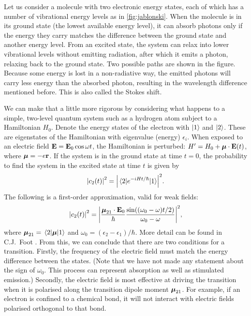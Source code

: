 Let us consider a molecule with two electronic energy states, each of which has a number of vibrational energy levels as in \autoref{fig:jablonski}. When the molecule is in its ground state (the lowest available energy level), it can absorb photons only if the energy they carry matches the difference between the ground state and another energy level. From an excited state, the system can relax into lower vibrational levels without emitting radiation, after which it emits a photon, relaxing back to the ground state. Two possible paths are shown in the figure. Because some energy is lost in a non-radiative way, the emitted photons will carry less energy than the absorbed photon, resulting in the wavelength difference mentioned before. This is also called the Stokes shift. 

We can make that a little more rigorous by considering what happens to a simple, two-level quantum system such as a hydrogen atom subject to a Hamiltonian $ H_0 $. Denote the energy states of the electron with $ \ket{1} $ and $ \ket{2} $. These are eigenstates of the Hamiltonian with eigenvalue (energy) $ \epsilon_i $. When exposed to an electric field $ \vb{E} = \vb{E}_0 \cos\omega t$, the Hamiltonian is perturbed: $ H' = H_0 + \vb*{\mu} \cdot \vb{E}(t) $, where $ \vb*{\mu} = -e\vb{r}$. If the system is in the ground state at time $ t=0 $, the probability to find the system in the excited state at time $ t $ is given by
\begin{equation}
	\abs{c_2(t)}^2 = \abs{\mel{2}{e^{-iHt/\hbar}}{1}}^2.
\end{equation}
The following is a first-order approximation, valid for weak fields:
\begin{equation}
	\abs{c_2(t)}^2 = \abs{ \frac{\vb*{\mu}_{21}\cdot\vb{E}_0}{\hbar}  \frac{\sin((\omega_0-\omega)t/2)}{\omega_0-\omega}}^2,
	\label{eq:transition moment}
\end{equation}
where $ \vb*{\mu}_{21} = \mel{2}{\vb*{\mu}}{1} $ and $ \omega_0 = (\epsilon_2-\epsilon_1)/\hbar $. More detail can be found in C.J.~Foot \cite{Foot}. From this, we can conclude that there are two conditions for a transition. Firstly, the frequency of the electric field must match the energy difference between the states. (Note that we have not made any statement about the sign of $ \omega_0 $. This process can represent absorption as well as stimulated emission.) Secondly, the electric field is most effective at driving the transition when it is polarised along the transition dipole moment $ \vb*{\mu}_{21} $. For example, if an electron is confined to a chemical bond, it will not interact with electric fields polarised orthogonal to that bond.

